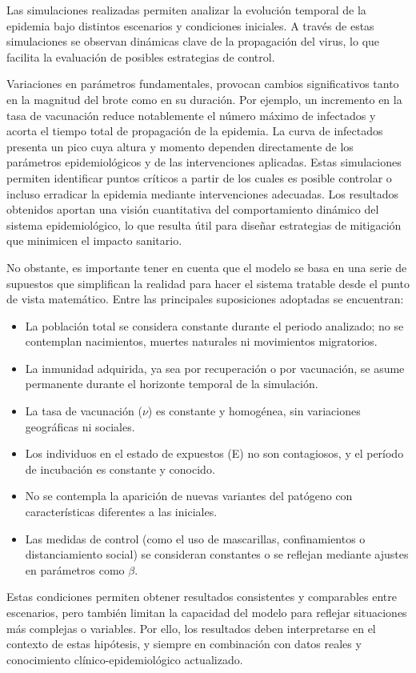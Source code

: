 Las simulaciones realizadas permiten analizar la evolución temporal de la epidemia bajo distintos escenarios y condiciones iniciales. A través de estas simulaciones se observan dinámicas clave de la propagación del virus, lo que facilita la evaluación de posibles estrategias de control.

 Variaciones en parámetros fundamentales, provocan cambios significativos tanto en la magnitud del brote como en su duración. Por ejemplo, un incremento en la tasa de vacunación reduce notablemente el número máximo de infectados y acorta el tiempo total de propagación de la epidemia. La curva de infectados presenta un pico cuya altura y momento dependen directamente de los parámetros epidemiológicos y de las intervenciones aplicadas.
Estas simulaciones permiten identificar puntos críticos a partir de los cuales es posible controlar o incluso erradicar la epidemia mediante intervenciones adecuadas. Los resultados obtenidos aportan una visión cuantitativa del comportamiento dinámico del sistema epidemiológico, lo que resulta útil para diseñar estrategias de mitigación que minimicen el impacto sanitario.

No obstante, es importante tener en cuenta que el modelo se basa en una serie de supuestos que simplifican la realidad para hacer el sistema tratable desde el punto de vista matemático. Entre las principales suposiciones adoptadas se encuentran:

\begin{itemize}
    \item La población total se considera constante durante el periodo analizado; no se contemplan nacimientos, muertes naturales ni movimientos migratorios.
    \item La inmunidad adquirida, ya sea por recuperación o por vacunación, se asume permanente durante el horizonte temporal de la simulación.
    \item La tasa de vacunación (\(\nu\)) es constante y homogénea, sin variaciones geográficas ni sociales.
    \item Los individuos en el estado de expuestos (E) no son contagiosos, y el período de incubación es constante y conocido.
    \item No se contempla la aparición de nuevas variantes del patógeno con características diferentes a las iniciales.
    \item Las medidas de control (como el uso de mascarillas, confinamientos o distanciamiento social) se consideran constantes o se reflejan mediante ajustes en parámetros como \(\beta\).
\end{itemize}

Estas condiciones permiten obtener resultados consistentes y comparables entre escenarios, pero también limitan la capacidad del modelo para reflejar situaciones más complejas o variables. Por ello, los resultados deben interpretarse en el contexto de estas hipótesis, y siempre en combinación con datos reales y conocimiento clínico-epidemiológico actualizado.

